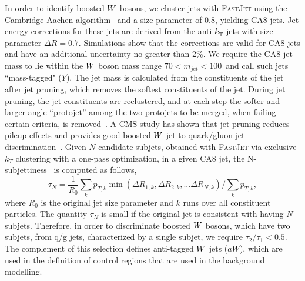 
In order to identify boosted $W$ bosons,  we cluster jets  with \textsc{FastJet} using the
Cambridge-Aachen algorithm~\cite{Dokshitzer:1997in} and a size parameter of 0.8, yielding CA8 jets. 
Jet energy corrections for these jets are derived from the anti-$k_\textrm{T}$ jets with  size
parameter $\Delta R=0.7$. Simulations show that the corrections are valid for CA8 jets and have an
additional uncertainty no greater than  2\%.  We require the CA8 jet mass to lie within the $W$
boson mass range $70 < m_{jet} < 100$~\GeV and call such jets ``mass-tagged" ($Y$).  
The jet mass is calculated from the constituents of the jet after jet pruning, which removes the
softest constituents of the jet.  During jet pruning, the jet constituents are reclustered, and at
each step the softer and larger-angle ``protojet'' among the two protojets to be merged, when
failing certain criteria, is removed~\cite{Ellis:2009su,Ellis:2009me}.  
A CMS study has shown that jet pruning reduces pileup effects and provides good boosted $W$ jet to
quark/gluon jet discrimination~\cite{Chatrchyan:2013vbb}.
Given $N$ candidate subjets, obtained with \textsc{FastJet} via exclusive $k_T$ clustering with a
one-pass optimization, in a given CA8 jet, the N-subjettiness~\cite{Thaler:2010tr} is computed
as follows, 
\begin{equation}
\tau_N = \frac{1}{R_0} \sum_k p_{T, k} \min (\Delta R_{1,k}, \Delta R_{2,k}, ... \Delta R_{N,k}) /
\sum_{k} p_{T, k},
\end{equation}
where $R_0$ is the original jet size parameter and $k$ runs over all constituent particles.  
The quantity $\tau_N$ is small if the original jet is consistent with having $N$ subjets.  
Therefore, in order to discriminate boosted $W$ bosons, which have two subjets, from q/g jets,
characterized by a single subjet, we require $\tau_2 / \tau_1 < 0.5$.  The complement of this
selection defines anti-tagged $W$ jets ($aW$), which are used in the definition of control regions
that are used in the background modelling.


